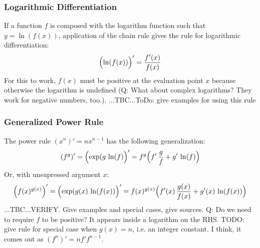 







\subsubsection{Logarithmic Differentiation} 
If a function $f$ is composed with the logarithm function such that $y = \ln(f(x))$, application of the chain rule gives the rule for logarithmic differentiation:
\begin{equation}
 \Bigl( \ln(f(x)) \Bigr)' = \frac{f'(x)}{f(x)}
\end{equation}
For this to work, $f(x)$ must be positive at the evaluation point $x$ because otherwise the logarithm is undefined (Q: What about complex logarithms? They work for negative numbers, too.). ...TBC...ToDo: give examples for using this rule



\subsubsection{Generalized Power Rule} 
The power rule $(x^n)' = n x^{n-1}$ has the following generalization:
\begin{equation}
 (f^g)' = \Bigl( \exp(g \, \ln(f) \Bigr) '
        = f^g \Bigl(f ' \, \frac{g}{f} + g' \, \ln(f) \Bigr)
\end{equation}
Or, with unsupressed argument $x$:
\begin{equation}
 \Bigl(f(x)^{g(x)}\Bigr)' 
 = \Bigl( \exp(g(x) \, \ln(f(x)) \Bigr) '
 = f(x)^{g(x)} \Bigl(f'(x) \, \frac{g(x)}{f(x)} + g'(x) \, \ln(f(x)) \Bigr)
\end{equation}
...TBC...VERIFY. Give examples and special cases, give sources. Q: Do we need to require $f$ to be positive? It appears inside a logarithm on the RHS. TODO: give rule for special case when $g(x) = n$, i.e. an integer constant. I think, it comes out as $(f^n)' = n f' f^{n-1}$.

